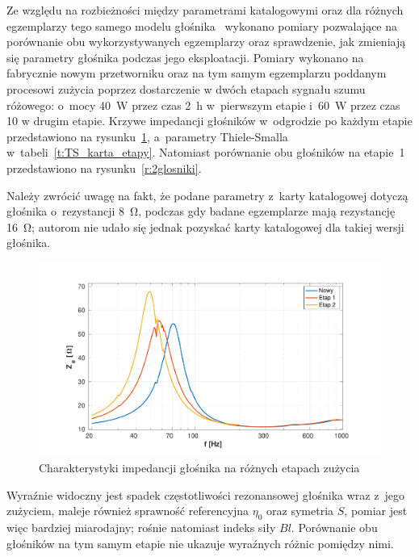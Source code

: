 \documentclass[12pt]{oska}
\begin{document}
	Ze względu na rozbieżności między parametrami katalogowymi oraz dla różnych egzemplarzy tego samego modelu głośnika~\cite{aes_roznice} wykonano pomiary pozwalające na porównanie obu wykorzystywanych egzemplarzy oraz sprawdzenie, jak zmieniają się parametry głośnika podczas jego eksploatacji. Pomiary wykonano na fabrycznie nowym przetworniku oraz na tym samym egzemplarzu poddanym procesowi zużycia poprzez dostarczenie w dwóch etapach sygnału szumu różowego: o~mocy \SI{40}{\watt} przez czas \SI{2}{\hour} w~pierwszym etapie i~\SI{60}{\watt} przez czas \SI{10}{\min} w drugim etapie. Krzywe impedancji głośników w~odgrodzie po każdym etapie przedstawiono na rysunku~\ref{r:wygrzewanie}, a~parametry Thiele-Smalla w~tabeli~\ref{t:TS_karta_etapy}. Natomiast porównanie obu głośników na etapie~1 przedstawiono na rysunku~\ref{r:2glosniki}.
	
	Należy zwrócić uwagę na fakt, że podane parametry z~karty katalogowej dotyczą głośnika o~rezystancji \SI{8}{\ohm}, podczas gdy badane egzemplarze mają rezystancję \SI{16}{\ohm}; autorom nie udało się jednak pozyskać karty katalogowej dla takiej wersji głośnika.
	
	\begin{figure}[!ht]
		\centering
		\includegraphics[width=.8\textwidth,trim={2cm .5cm 2cm 1cm},clip]{odgroda_wygrzewanie.pdf}
		\caption{Charakterystyki impedancji głośnika na różnych etapach zużycia}
		\label{r:wygrzewanie}
	\end{figure}
	
	Wyraźnie widoczny jest spadek częstotliwości rezonansowej głośnika wraz z~jego zużyciem, maleje również sprawność referencyjna $\eta_0$ oraz symetria $S$, pomiar jest więc bardziej miarodajny; rośnie natomiast indeks siły $Bl$. Porównanie obu głośników na tym samym etapie nie ukazuje wyraźnych różnic pomiędzy nimi.
	
\end{document}
